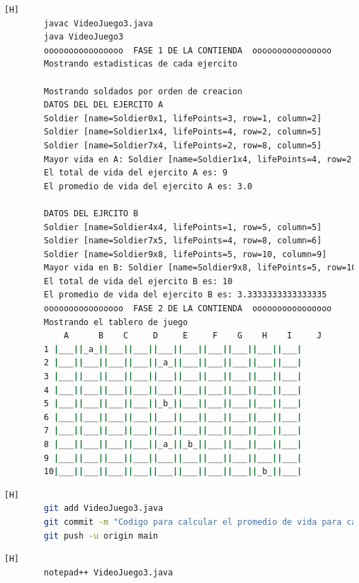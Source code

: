 \documentclass{article}
\begin{document}
	
	\begin{lstlisting}[language=bash,caption={Compilando y probando }][H]
		javac VideoJuego3.java
		java VideoJuego3
		oooooooooooooooo  FASE 1 DE LA CONTIENDA  oooooooooooooooo
		Mostrando estadisticas de cada ejercito
		
		Mostrando soldados por orden de creacion
		DATOS DEL DEL EJERCITO A
		Soldier [name=Soldier0x1, lifePoints=3, row=1, column=2]
		Soldier [name=Soldier1x4, lifePoints=4, row=2, column=5]
		Soldier [name=Soldier7x4, lifePoints=2, row=8, column=5]
		Mayor vida en A: Soldier [name=Soldier1x4, lifePoints=4, row=2, column=5]
		El total de vida del ejercito A es: 9
		El promedio de vida del ejercito A es: 3.0
		
		DATOS DEL EJRCITO B
		Soldier [name=Soldier4x4, lifePoints=1, row=5, column=5]
		Soldier [name=Soldier7x5, lifePoints=4, row=8, column=6]
		Soldier [name=Soldier9x8, lifePoints=5, row=10, column=9]
		Mayor vida en B: Soldier [name=Soldier9x8, lifePoints=5, row=10, column=9]
		El total de vida del ejercito B es: 10
		El promedio de vida del ejercito B es: 3.3333333333333335
		oooooooooooooooo  FASE 2 DE LA CONTIENDA  oooooooooooooooo
		Mostrando el tablero de juego
		    A      B    C     D     E     F    G    H    I     J
		1 |___||_a_||___||___||___||___||___||___||___||___|
		2 |___||___||___||___||_a_||___||___||___||___||___|
		3 |___||___||___||___||___||___||___||___||___||___|
		4 |___||___||___||___||___||___||___||___||___||___|
		5 |___||___||___||___||_b_||___||___||___||___||___|
		6 |___||___||___||___||___||___||___||___||___||___|
		7 |___||___||___||___||___||___||___||___||___||___|
		8 |___||___||___||___||_a_||_b_||___||___||___||___|
		9 |___||___||___||___||___||___||___||___||___||___|
		10|___||___||___||___||___||___||___||___||_b_||___|
	\end{lstlisting}
	
	
	\begin{lstlisting}[language=bash,caption={Commit:Codigo para calcular el promedio de vida para cada ejercito}][H]
		git add VideoJuego3.java
		git commit -m "Codigo para calcular el promedio de vida para cada ejercito"			
		git push -u origin main
	\end{lstlisting}	
	
	
	
	
	\begin{lstlisting}[language=bash,caption={Se implementa el método que ordena el ArrayList mostrando un ranking}][H]
		notepad++ VideoJuego3.java
	\end{lstlisting}
	
\end{document}
